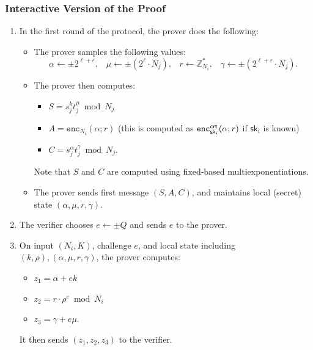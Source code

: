 \documentclass[11pt]{article}
\def\crt{{\sf crt}}
\newcommand{\enc}{\ensuremath{\mathtt{enc}}}
\newcommand{\commit}[1]{\ensuremath{\mathtt{Commit}_{\mathtt{#1}}}}
\newcommand{\sk}{\textsf{sk}}
\newcommand{\Z}{\mathbb{Z}}
\newcommand{\?}[1]{\stackrel{?}{#1}}
\begin{document}
\subsubsection{Interactive Version of the Proof}

\begin{enumerate}
    \item In the first round of the protocol, the prover does the following:
    \begin{itemize}
        \item The prover  samples the following values:
        \[\alpha \gets \pm 2^{\ell + \varepsilon}, \;\;\;
        \mu \gets \pm (2^\ell \cdot N_j), \;\;\;
        r \gets \Z_{N_i}^*, \;\;\;
        \gamma \gets \pm (2^{\ell + \varepsilon} \cdot N_j).\]

        \item The prover then computes:
\begin{itemize}
        \item $S = s_j^k t_j^\mu \bmod N_j$ 
            \item $A = \enc_{N_i}(\alpha; r)$  (this is computed as $\enc^\crt_{\sk_i}(\alpha; r)$ if $\sk_i$ is known)
            \item $C = s_j^\alpha t_j^\gamma \bmod N_j$.
\end{itemize}
      Note that $S$ and $C$ are computed using fixed-based multiexponentiations.
        

        \item The prover sends first message $(S, A, C)$, and maintains local (secret) state $(\alpha, \mu, r, \gamma)$.
    \end{itemize}

    \item The verifier chooses $e \gets \pm Q$ and sends $e$ to the prover.

    \item On input $(N_i, K)$, challenge $e$, and local state including $(k, \rho), (\alpha, \mu, r, \gamma)$, the prover computes:
\begin{itemize}
\item    $z_1 = \alpha + e k $
\item    $z_2 = r \cdot \rho^e \bmod N_i $
\item    $z_3 = \gamma + e \mu$.
\end{itemize}
    It then sends $(z_1, z_2, z_3)$ to the verifier.


\end{enumerate}
\end{document}
